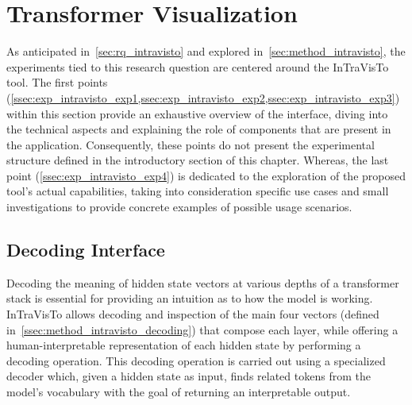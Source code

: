 \section{Transformer Visualization}\label{sec:exp_intravisto}

As anticipated in~\cref{sec:rq_intravisto} and explored in~\cref{sec:method_intravisto}, the experiments tied to this research question are centered around the InTraVisTo tool.
The first points (\cref{ssec:exp_intravisto_exp1,ssec:exp_intravisto_exp2,ssec:exp_intravisto_exp3}) within this section provide an exhaustive overview of the interface, diving into the technical aspects and explaining the role of components that are present in the application.
Consequently, these points do not present the experimental structure defined in the introductory section of this chapter.
Whereas, the last point (\cref{ssec:exp_intravisto_exp4}) is dedicated to the exploration of the proposed tool's actual capabilities, taking into consideration specific use cases and small investigations to provide concrete examples of possible usage scenarios.

\subsection{Decoding Interface}\label{ssec:exp_intravisto_exp1}

Decoding the meaning of hidden state vectors at various depths of a transformer stack is essential for providing an intuition as to how the model is working.
InTraVisTo allows decoding and inspection of the main four vectors (defined in~\cref{ssec:method_intravisto_decoding}) that compose each layer, while offering a human-interpretable representation of each hidden state by performing a decoding operation.
This decoding operation is carried out using a specialized decoder which, given a hidden state as input, finds related tokens from the model's vocabulary with the goal of returning an interpretable output.

